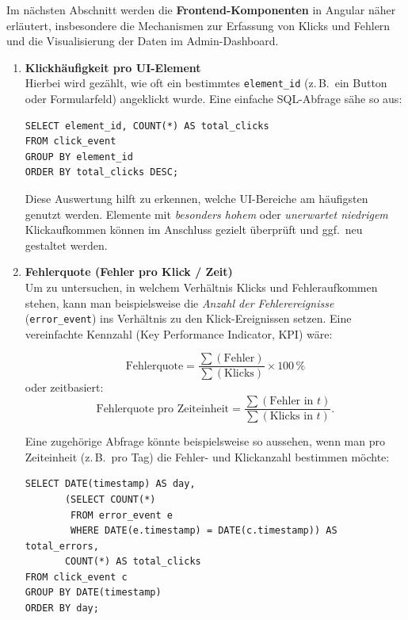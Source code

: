 \documentclass[12pt,oneside]{article}
\begin{document}
Im nächsten Abschnitt werden die \textbf{Frontend-Komponenten} in Angular näher erläutert, insbesondere die Mechanismen zur Erfassung von Klicks und Fehlern und die Visualisierung der Daten im Admin-Dashboard.
\begin{enumerate}
    \item \textbf{Klickhäufigkeit pro UI-Element}\\
    Hierbei wird gezählt, wie oft ein bestimmtes \lstinline|element_id| (z.\,B.\ ein Button oder Formularfeld) angeklickt wurde. Eine einfache SQL-Abfrage sähe so aus:

    \begin{lstlisting}[style=sql,caption={Beispiel: Klickhäufigkeit pro Element}]
SELECT element_id, COUNT(*) AS total_clicks
FROM click_event
GROUP BY element_id
ORDER BY total_clicks DESC;
    \end{lstlisting}

    Diese Auswertung hilft zu erkennen, welche UI-Bereiche am häufigsten genutzt werden. Elemente mit \emph{besonders hohem} oder \emph{unerwartet niedrigem} Klickaufkommen können im Anschluss gezielt überprüft und ggf.\ neu gestaltet werden.

    \item \textbf{Fehlerquote (Fehler pro Klick / Zeit)}\\
    Um zu untersuchen, in welchem Verhältnis Klicks und Fehleraufkommen stehen, kann man beispielsweise die \emph{Anzahl der Fehlerereignisse} (\lstinline|error_event|) ins Verhältnis zu den Klick-Ereignissen setzen. Eine vereinfachte Kennzahl (Key Performance Indicator, KPI) wäre:

    \[
    \text{Fehlerquote} = \frac{\sum (\text{Fehler})}{\sum (\text{Klicks})} \times 100\,\%
    \]
    oder zeitbasiert:
    \[
    \text{Fehlerquote pro Zeiteinheit} = \frac{\sum (\text{Fehler in } t)}{\sum (\text{Klicks in } t)}.
    \]

    Eine zugehörige Abfrage könnte beispielsweise so aussehen, wenn man pro Zeiteinheit (z.\,B.\ pro Tag) die Fehler- und Klickanzahl bestimmen möchte:

    \begin{lstlisting}[style=sql,caption={Beispiel: Fehler- und Klickanzahl pro Tag}]
SELECT DATE(timestamp) AS day,
       (SELECT COUNT(*) 
        FROM error_event e 
        WHERE DATE(e.timestamp) = DATE(c.timestamp)) AS total_errors,
       COUNT(*) AS total_clicks
FROM click_event c
GROUP BY DATE(timestamp)
ORDER BY day;
    \end{lstlisting}


\end{enumerate}
\end{document}
